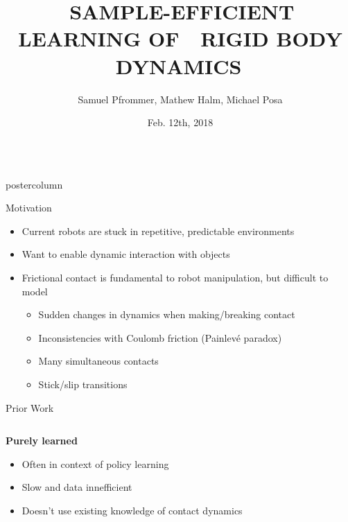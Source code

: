 \documentclass[final,hyperref={pdfpagelabels=false},5pt]{beamer}
\title{{\noindent  \,SAMPLE-EFFICIENT LEARNING OF \, \linebreak \,RIGID BODY DYNAMICS\, \linebreak} }
\author{Samuel Pfrommer, Mathew Halm, Michael Posa}
\institute[University of Pennsylvania]{DAIR Laboratory --- GRASP Laboratory --- University of Pennsylvania}
\date{Feb. 12th, 2018}
\newlength{\columnheight}
\begin{document}
\begin{frame}
  \vspace{-26ex}
    \begin{columns}
    \begin{column}{.49\textwidth}
      \begin{beamercolorbox}[center,wd=\textwidth]{postercolumn}
        \begin{minipage}[T]{.95\textwidth}  %
          \parbox[t][\columnheight]{\textwidth}{ %
            \begin{block}{Motivation}
              \color{penndkbl}
                    \begin{itemize}
                        \item Current robots are stuck in repetitive, predictable environments
                        \item Want to enable dynamic interaction with objects
                        \item Frictional contact is fundamental to robot manipulation, but difficult to model
                            \begin{itemize}
                                \item Sudden changes in dynamics when making/breaking contact 
                                \item Inconsistencies with Coulomb friction (Painlev\'{e} paradox)
                                \item Many simultaneous contacts
                                \item Stick/slip transitions
                            \end{itemize}
                    \end{itemize}
              \end{block}
                      
            \begin{block}{Prior Work}
                \begin{columns}[t]
                    \begin{column}{0.3\textwidth}
                        \textbf{Purely learned}
                        \begin{itemize}
                            \item Often in context of policy learning
                            \item Slow and data innefficient
                            \item Doesn't use existing knowledge of contact dynamics
                        \end{itemize}
                    \end{column}


\end{columns}
\end{block}}
\end{minipage}
\end{beamercolorbox}
\end{column}
\end{columns}
\end{frame}
\end{document}
